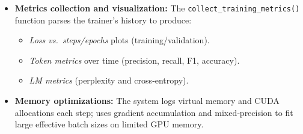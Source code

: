 \documentclass[../main.tex]{subfiles}
\begin{document}
\begin{itemize}
  \item \textbf{Metrics collection and visualization:}  
    The \texttt{collect\_training\_metrics()} function parses the trainer’s history to produce:
    \begin{itemize}
      \item \emph{Loss vs.\ steps/epochs} plots (training/validation).  
      \item \emph{Token metrics} over time (precision, recall, F1, accuracy).  
      \item \emph{LM metrics} (perplexity and cross‑entropy).
    \end{itemize}

  \item \textbf{Memory optimizations:}  
    The system logs virtual memory and CUDA allocations each step; uses gradient accumulation and mixed‑precision to fit large effective batch sizes on limited GPU memory.
\end{itemize}
\end{document}
